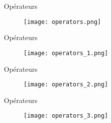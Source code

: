 \begin{frame}[fragile]{Opérateurs}
  \begin{figure}[!h]
    \texttt{[image: operators.png]}
  \end{figure}
\end{frame}
\begin{frame}[fragile]{Opérateurs}
  \addtocounter{framenumber}{-1}
  \begin{figure}[!h]
    \texttt{[image: operators\_1.png]}
  \end{figure}
\end{frame}
\begin{frame}[fragile]{Opérateurs}
  \addtocounter{framenumber}{-1}
  \begin{figure}[!h]
    \texttt{[image: operators\_2.png]}
  \end{figure}
\end{frame}
\begin{frame}[fragile]{Opérateurs}
  \addtocounter{framenumber}{-1}
  \begin{figure}[!h]
    \texttt{[image: operators\_3.png]}
  \end{figure}
\end{frame}



